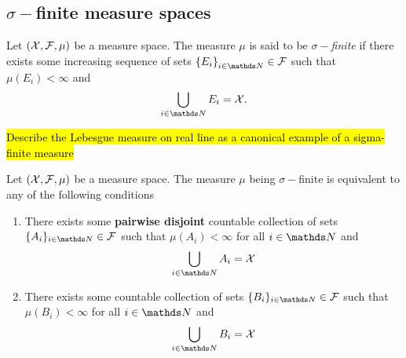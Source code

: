 \subsection{$\sigma-$finite measure spaces}
\begin{defn}
\label{def:sigmaFinite}Let $\left(\mathcal{X},\mathcal{F},\mu\right)$ be a measure
space. The measure $\mu$ is said to be $\sigma-$\emph{finite }if
there exists some increasing sequence of sets $\left\{ E_{i}\right\} _{i\in\N}\in\F$
such that $\mu\left(E_{i}\right)<\infty$ and
\[
\bigcup_{i\in\N}E_{i}=\X.
\]

\hl{Describe the Lebesgue measure on real line as a canonical example of a sigma-finite measure}
\end{defn}

\begin{prop}
\label{prop:equivSigmaFinite}Let $\left(\mathcal{X},\mathcal{F},\mu\right)$ be a measure
space. The measure $\mu$ being $\sigma-$finite is equivalent to
any of the following conditions

\begin{enumerate}[label=(\roman*),leftmargin=.1\linewidth,rightmargin=0.15\linewidth]
	\item There exists some \textbf{pairwise disjoint} countable collection of sets $\{A_i\}_{i\in\N} \in \F$ such that $ \mu\left(A_i\right) < \infty $ for all $ i \in \N $ and
	\[
					\bigcup_{i\in\N}A_i = \X
	\]
	\item There exists some countable collection of sets $\{B_i\}_{i\in\N} \in \F$ such that $ \mu\left(B_i\right) < \infty $ for all $ i \in \N $ and
	\[
					\bigcup_{i\in\N}B_i = \X
	\]
\end{enumerate}
\end{prop}

